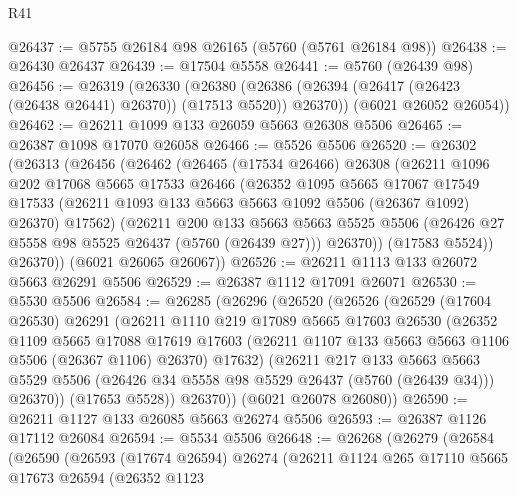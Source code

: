 \begin{lexlean}{R41}
\begin{coremodule}
@26437 := @5755 @26184 @98 @26165 (@5760 (@5761 @26184 @98))
@26438 := @26430 @26437
@26439 := @17504 @5558
@26441 := @5760 (@26439 @98)
@26456 := @26319
    (@26330
      (@26380 (@26386 (@26394 (@26417 (@26423 (@26438 @26441) @26370)) (@17513 @5520)) @26370))
      (@6021 @26052 @26054))
@26462 := @26211 @1099 @133 @26059 @5663 @26308 @5506
@26465 := @26387 @1098 @17070 @26058
@26466 := @5526 @5506
@26520 := @26302
    (@26313
      (@26456
        (@26462
          (@26465
            (@17534 @26466)
            @26308
            (@26211
              @1096
              @202
              @17068
              @5665
              @17533
              @26466
              (@26352
                @1095
                @5665
                @17067
                @17549
                @17533
                (@26211 @1093 @133 @5663 @5663 @1092 @5506 (@26367 @1092) @26370)
                @17562)
              (@26211
                @200
                @133
                @5663
                @5663
                @5525
                @5506
                (@26426 @27 @5558 @98 @5525 @26437 (@5760 (@26439 @27)))
                @26370))
            (@17583 @5524))
          @26370))
      (@6021 @26065 @26067))
@26526 := @26211 @1113 @133 @26072 @5663 @26291 @5506
@26529 := @26387 @1112 @17091 @26071
@26530 := @5530 @5506
@26584 := @26285
    (@26296
      (@26520
        (@26526
          (@26529
            (@17604 @26530)
            @26291
            (@26211
              @1110
              @219
              @17089
              @5665
              @17603
              @26530
              (@26352
                @1109
                @5665
                @17088
                @17619
                @17603
                (@26211 @1107 @133 @5663 @5663 @1106 @5506 (@26367 @1106) @26370)
                @17632)
              (@26211
                @217
                @133
                @5663
                @5663
                @5529
                @5506
                (@26426 @34 @5558 @98 @5529 @26437 (@5760 (@26439 @34)))
                @26370))
            (@17653 @5528))
          @26370))
      (@6021 @26078 @26080))
@26590 := @26211 @1127 @133 @26085 @5663 @26274 @5506
@26593 := @26387 @1126 @17112 @26084
@26594 := @5534 @5506
@26648 := @26268
    (@26279
      (@26584
        (@26590
          (@26593
            (@17674 @26594)
            @26274
            (@26211
              @1124
              @265
              @17110
              @5665
              @17673
              @26594
              (@26352
                @1123

\end{coremodule}
\end{lexlean}
